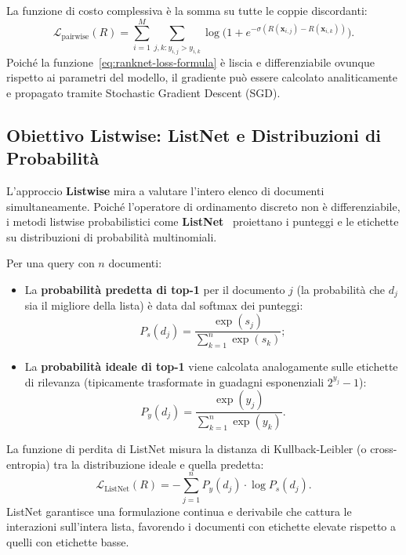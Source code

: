 La funzione di costo complessiva \`e la somma su tutte le coppie discordanti:
\begin{equation}
\mathcal{L}_{\text{pairwise}}(R) = \sum_{i=1}^M \sum_{j, k : y_{i,j} > y_{i,k}} \log \Big( 1 + e^{-\sigma(R(\mathbf{x}_{i,j}) - R(\mathbf{x}_{i,k}))} \Big).
\end{equation}
Poich\'e la funzione~\eqref{eq:ranknet-loss-formula} \`e liscia e differenziabile ovunque rispetto ai parametri del modello, il gradiente pu\`o essere calcolato analiticamente e propagato tramite Stochastic Gradient Descent (SGD).

\FloatBarrier
\subsection{Obiettivo Listwise: ListNet e Distribuzioni di Probabilit\`a}
\label{subsec:obiettivo-listwise-listnet}
L'approccio \textbf{Listwise} mira a valutare l'intero elenco di documenti simultaneamente. Poich\'e l'operatore di ordinamento discreto non \`e differenziabile, i metodi listwise probabilistici come \textbf{ListNet}~\cite{cao2007} proiettano i punteggi e le etichette su distribuzioni di probabilit\`a multinomiali.

Per una query con $n$ documenti:
\begin{itemize}
    \item La \textbf{probabilit\`a predetta di top-1} per il documento $j$ (la probabilit\`a che $d_j$ sia il migliore della lista) \`e data dal softmax dei punteggi:
    \begin{equation}
    P_s(d_j) = \frac{\exp(s_j)}{\sum_{k=1}^n \exp(s_k)};
    \end{equation}
    \item La \textbf{probabilit\`a ideale di top-1} viene calcolata analogamente sulle etichette di rilevanza (tipicamente trasformate in guadagni esponenziali $2^{y_j} - 1$):
    \begin{equation}
    P_y(d_j) = \frac{\exp(y_j)}{\sum_{k=1}^n \exp(y_k)}.
    \end{equation}
\end{itemize}

La funzione di perdita di ListNet misura la distanza di Kullback-Leibler (o cross-entropia) tra la distribuzione ideale e quella predetta:
\begin{equation}
\mathcal{L}_{\text{ListNet}}(R) = - \sum_{j=1}^n P_y(d_j) \cdot \log P_s(d_j).
\end{equation}
ListNet garantisce una formulazione continua e derivabile che cattura le interazioni sull'intera lista, favorendo i documenti con etichette elevate rispetto a quelli con etichette basse.


